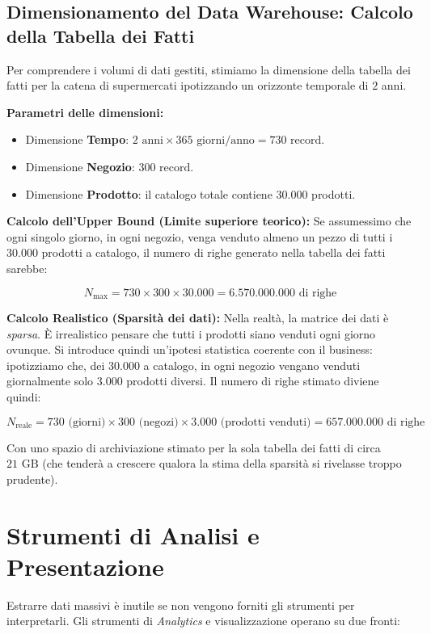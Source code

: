 \subsection{Dimensionamento del Data Warehouse: Calcolo della Tabella dei Fatti}
Per comprendere i volumi di dati gestiti, stimiamo la dimensione della tabella dei fatti per la catena di supermercati ipotizzando un orizzonte temporale di $2$ anni.

\textbf{Parametri delle dimensioni:}
\begin{itemize}
\item Dimensione \textbf{Tempo}: $2 \text{ anni} \times 365 \text{ giorni/anno} = 730 \text{ record}$.
\item Dimensione \textbf{Negozio}: $300 \text{ record}$.
\item Dimensione \textbf{Prodotto}: il catalogo totale contiene $30.000$ prodotti.
\end{itemize}

\textbf{Calcolo dell'Upper Bound (Limite superiore teorico):}
Se assumessimo che ogni singolo giorno, in ogni negozio, venga venduto almeno un pezzo di tutti i $30.000$ prodotti a catalogo, il numero di righe generato nella tabella dei fatti sarebbe:


$$ N_{\text{max}} = 730 \times 300 \times 30.000 = 6.570.000.000 \text{ di righe} $$

\textbf{Calcolo Realistico (Sparsità dei dati):}
Nella realtà, la matrice dei dati è \textit{sparsa}. È irrealistico pensare che tutti i prodotti siano venduti ogni giorno ovunque. Si introduce quindi un'ipotesi statistica coerente con il business: ipotizziamo che, dei $30.000$ a catalogo, in ogni negozio vengano venduti giornalmente solo $3.000$ prodotti diversi.
Il numero di righe stimato diviene quindi:


$$ N_{\text{reale}} = 730 \text{ (giorni)} \times 300 \text{ (negozi)} \times 3.000 \text{ (prodotti venduti)} = 657.000.000 \text{ di righe} $$


Con uno spazio di archiviazione stimato per la sola tabella dei fatti di circa $21 \text{ GB}$ (che tenderà a crescere qualora la stima della sparsità si rivelasse troppo prudente).

\section{Strumenti di Analisi e Presentazione}

Estrarre dati massivi è inutile se non vengono forniti gli strumenti per interpretarli. Gli strumenti di \textit{Analytics} e visualizzazione operano su due fronti:

